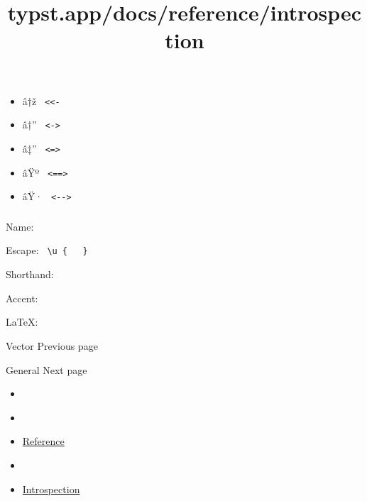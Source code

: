 \begin{itemize}
\item
  \label{symbol-arrow.l.twohead}{{ â†ž }
  \texttt{\ \textless{}\textless{}-\ }}
\item
  \label{symbol-arrow.l.r}{{ â†'' }
  \texttt{\ \textless{}-\textgreater{}\ }}
\item
  \label{symbol-arrow.l.r.double}{{ â‡'' }
  \texttt{\ \textless{}=\textgreater{}\ }}
\item
  \label{symbol-arrow.l.r.double.long}{{ âŸº }
  \texttt{\ \textless{}==\textgreater{}\ }}
\item
  \label{symbol-arrow.l.r.long}{{ âŸ· }
  \texttt{\ \textless{}-\/-\textgreater{}\ }}
\end{itemize}

{ }

\subsubsection{\texorpdfstring{{ }}{ }}\label{section-1}

Name: \texttt{\ }


Escape: \texttt{\ \textbackslash{}u\ \{\ }{\texttt{\ }}\texttt{\ \}\ }


Shorthand: \texttt{\ }

{ }

Accent:


LaTeX: \texttt{\ }

{ }

\href{/docs/reference/math/vec/}{\pandocbounded{}}

{ Vector } { Previous page }

\href{/docs/reference/symbols/sym/}{\pandocbounded{}}

{ General } { Next page }


\title{typst.app/docs/reference/introspection}

\begin{itemize}
\tightlist
\item
  \href{/docs}{}
\item
  
\item
  \href{/docs/reference/}{Reference}
\item
  
\item
  \href{/docs/reference/introspection/}{Introspection}
\end{itemize}

